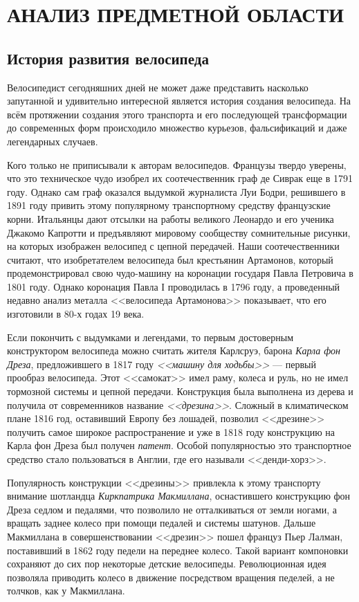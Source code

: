 \section[Анализ предметной области]{АНАЛИЗ ПРЕДМЕТНОЙ ОБЛАСТИ}

\subsection{История развития велосипеда}

Велосипедист сегодняшних дней не может даже представить насколько запутанной
и удивительно интересной является история создания велосипеда.
На всём протяжении создания этого транспорта и его последующей трансформации
до современных форм происходило множество курьезов, фальсификаций и даже легендарных случаев.

Кого только не приписывали к авторам велосипедов. Французы твердо уверены,
что это техническое чудо изобрел их соотечественник граф де Сиврак еще в 1791 году.
Однако сам граф оказался выдумкой журналиста Луи Бодри, решившего в 1891 году
привить этому популярному транспортному средству французские корни.
Итальянцы дают отсылки на работы великого Леонардо и его ученика
Джакомо Капротти и предъявляют мировому сообществу сомнительные рисунки,
на которых изображен велосипед с цепной передачей. Наши соотечественники считают,
что изобретателем велосипеда был крестьянин Артамонов, который продемонстрировал
свою чудо-машину на коронации государя Павла Петровича в 1801 году.
Однако коронация Павла І проводилась в 1796 году, а проведенный недавно анализ
металла <<велосипеда Артамонова>> показывает, что его изготовили в 80-х годах 19 века.

Если покончить с выдумками и легендами, то первым достоверным конструктором
велосипеда можно считать жителя Карлсруэ, барона \textit{Карла фон Дреза}, предложившего
в 1817 году \textit{<<машину для ходьбы>>} --- первый прообраз велосипеда. Этот <<самокат>> имел раму,
колеса и руль, но не имел тормозной системы и цепной передачи. Конструкция была
выполнена из дерева и получила от современников название \textit{<<дрезина>>}.
Сложный в климатическом плане 1816 год, оставивший Европу без лошадей,
позволил <<дрезине>> получить самое широкое распространение и уже в 1818 году
конструкцию на Карла фон Дреза был получен \textit{патент}. Особой популярностью
это транспортное средство стало пользоваться в Англии, где его называли <<денди-хорз>>.

Популярность конструкции <<дрезины>> привлекла к этому транспорту внимание шотландца
\textit{Киркпатрика Макмиллана}, оснастившего конструкцию фон Дреза седлом и педалями,
что позволило не отталкиваться от земли ногами, а вращать заднее колесо
при помощи педалей и системы шатунов. Дальше Макмиллана в совершенствовании <<дрезин>>
пошел француз Пьер Лалман, поставивший в 1862 году педели на переднее колесо.
Такой вариант компоновки сохраняют до сих пор некоторые детские велосипеды.
Революционная идея позволяла приводить колесо в движение посредством вращения педелей,
а не толчков, как у Макмиллана.


